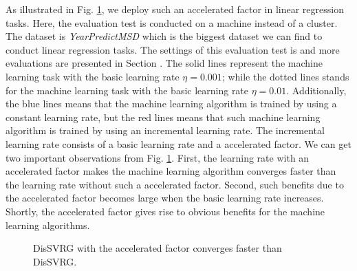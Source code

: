 \documentclass[10pt,journal,finalsubmission,compsoc]{IEEEtran}
\begin{document}
As illustrated in Fig. \ref{figure_evaluation_accelerated_factor}, we deploy such an accelerated factor in linear regression tasks. Here, the evaluation test is conducted on a machine instead of a cluster. The dataset is \emph{YearPredictMSD} which is the biggest dataset we can find to conduct linear regression tasks. The settings of this evaluation test  is and more evaluations are presented in Section \label{performance_evaluation}. 
The solid lines represent the machine learning task with the basic learning rate $\eta \mathrm{=}0.001$; while the dotted lines stands for the machine learning task with the basic learning rate $\eta \mathrm{=}0.01$. Additionally, the blue lines means that the machine learning algorithm is trained by using a constant learning rate, but the red lines means that such machine learning algorithm is trained by using an incremental learning rate. The incremental learning rate consists of a basic learning rate and a accelerated factor. We can get two important observations from Fig. \ref{figure_evaluation_accelerated_factor}. First, the learning rate with an accelerated factor makes the machine learning algorithm converges faster than the learning rate without such a accelerated factor. Second, such benefits due to the accelerated factor becomes large when the basic learning rate increases. Shortly,  the accelerated factor gives rise to obvious benefits for the machine learning algorithms.

\begin{figure}
\centering
{}
\caption{DisSVRG with the accelerated factor converges faster than DisSVRG.}
\label{figure_evaluation_accelerated_factor}
\end{figure}
\end{document}
